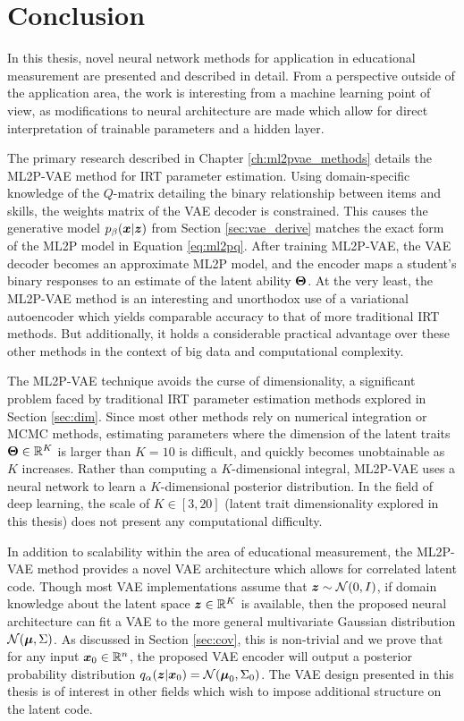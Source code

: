 \section{Conclusion}
In this thesis, novel neural network methods for application in educational measurement are presented and described in detail. From a perspective outside of the application area, the work is interesting from a machine learning point of view, as modifications to neural architecture are made which allow for direct interpretation of trainable parameters and a hidden layer.

The primary research described in Chapter \ref{ch:ml2pvae_methods} details the ML2P-VAE method for IRT parameter estimation. Using domain-specific knowledge of the $Q$-matrix detailing the binary relationship between items and skills, the weights matrix of the VAE decoder is constrained. This causes the generative model $p_\beta(\boldsymbol{x} | \boldsymbol{z})$ from Section \ref{sec:vae_derive} matches the exact form of the ML2P model in Equation \ref{eq:ml2pq}. After training ML2P-VAE, the VAE decoder becomes an approximate ML2P model, and the encoder maps a student's binary responses to an estimate of the latent ability $\boldsymbol{\Theta}$. At the very least, the ML2P-VAE method is an interesting and unorthodox use of a variational autoencoder which yields comparable accuracy to that of more traditional IRT methods. But additionally, it holds a considerable practical advantage over these other methods in the context of big data and computational complexity.

The ML2P-VAE technique avoids the curse of dimensionality, a significant problem faced by traditional IRT parameter estimation methods explored in Section \ref{sec:dim}. Since most other methods rely on numerical integration or MCMC methods, estimating parameters where the dimension of the latent traits $\boldsymbol{\Theta} \in\mathbb{R}^K$ is larger than $K=10$ is difficult, and quickly becomes unobtainable as $K$ increases. Rather than computing a $K$-dimensional integral, ML2P-VAE uses a neural network to learn a $K$-dimensional posterior distribution. In the field of deep learning, the scale of $K \in [3,20]$ (latent trait dimensionality explored in this thesis) does not present any computational difficulty.

In addition to scalability within the area of educational measurement, the ML2P-VAE method provides a novel VAE architecture which allows for correlated latent code. Though most VAE implementations assume that $\boldsymbol{z} \sim \mathcal{N}(0,I)$, if domain knowledge about the latent space $\boldsymbol{z} \in \mathbb{R}^K$ is available, then the proposed neural architecture can fit a VAE to the more general multivariate Gaussian distribution $\mathcal{N}(\boldsymbol{\mu}, \Sigma)$. As discussed in Section \ref{sec:cov}, this is non-trivial and we prove that for any input $\boldsymbol{x}_0 \in \mathbb{R}^n$, the proposed VAE encoder will output a posterior probability distribution $q_\alpha(\boldsymbol{z} | \boldsymbol{x}_0) = \mathcal{N}(\boldsymbol{\mu}_0, \Sigma_0)$. The VAE design presented in this thesis is of interest in other fields which wish to impose additional structure on the latent code.

